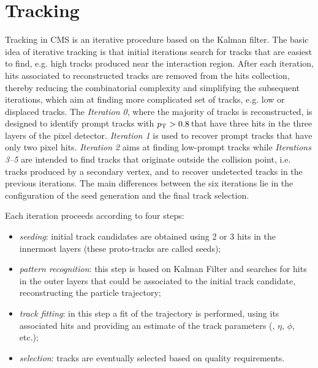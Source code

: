 \section{Tracking}
\label{sec:tracking}

Tracking in CMS is an iterative procedure based on the Kalman filter. The basic idea of iterative tracking is that initial iterations search for tracks that are easiest to find, e.g. high \pt tracks produced near the interaction region. After each iteration, hits associated to reconstructed tracks are removed from the hits collection, thereby reducing the combinatorial complexity and simplifying the subsequent iterations, which aim at finding more complicated set of tracks, e.g. low \pt or displaced tracks. The \emph{Iteration 0}, where the majority of tracks is reconstructed, is designed to identify prompt tracks with $p_\mathrm{T}>0.8$\,\GeV that have three hits in the three layers of the pixel detector. \emph{Iteration 1} is used to recover prompt tracks that have only two pixel hits. \emph{Iteration 2} aims at finding low-\pt prompt tracks while \emph{Iterations 3--5} are intended to find tracks that originate outside the collision point, i.e. tracks produced by a secondary vertex, and to recover undetected tracks in the previous iterations. The main differences between the six iterations lie in the configuration of the seed generation and the final track selection. 

Each iteration proceeds according to four steps:
\begin{itemize}
\item \emph{seeding}: initial track candidates are obtained using 2 or 3 hits in the innermost layers (these proto-tracks are called seeds);
\item \emph{pattern recognition}: this step is based on Kalman Filter and searches for hits in the outer layers that could be associated to the initial track candidate, reconstructing the particle trajectory;
\item \emph{track fitting}: in this step a fit of the trajectory is performed, using its associated hits and providing an estimate of the track parameters (\pt, $\eta$, $\phi$, etc.);
\item \emph{selection}: tracks are eventually selected based on quality requirements.
\end{itemize}

